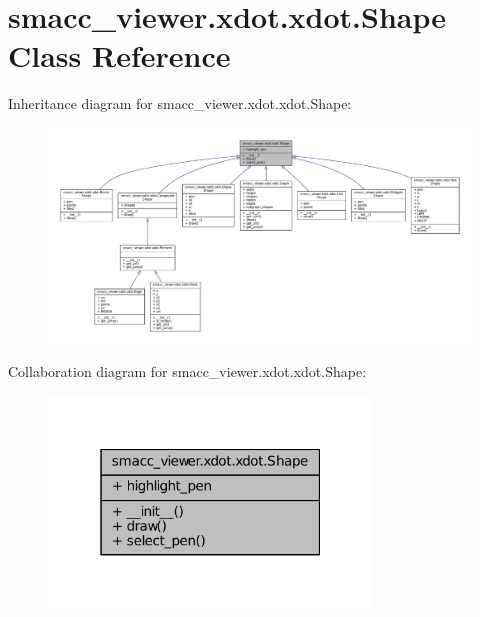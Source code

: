 \hypertarget{classsmacc__viewer_1_1xdot_1_1xdot_1_1Shape}{}\section{smacc\+\_\+viewer.\+xdot.\+xdot.\+Shape Class Reference}
\label{classsmacc__viewer_1_1xdot_1_1xdot_1_1Shape}


Inheritance diagram for smacc\+\_\+viewer.\+xdot.\+xdot.\+Shape\+:
\nopagebreak
\begin{figure}[H]
\begin{center}
\leavevmode
\includegraphics[width=350pt]{classsmacc__viewer_1_1xdot_1_1xdot_1_1Shape__inherit__graph}
\end{center}
\end{figure}


Collaboration diagram for smacc\+\_\+viewer.\+xdot.\+xdot.\+Shape\+:
\nopagebreak
\begin{figure}[H]
\begin{center}
\leavevmode
\includegraphics[width=244pt]{classsmacc__viewer_1_1xdot_1_1xdot_1_1Shape__coll__graph}
\end{center}
\end{figure}
